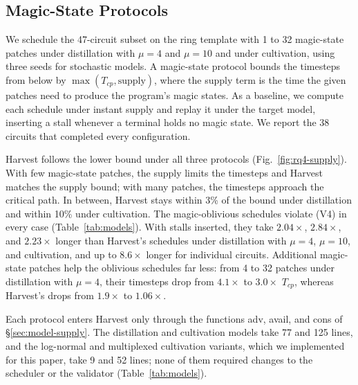 \subsection{Magic-State Protocols}
\label{sec:eval-supply}





We schedule the 47-circuit subset on the ring template with 1 to 32 magic-state patches under distillation with $\mu = 4$ and $\mu = 10$ and under cultivation, using three seeds for stochastic models.
A magic-state protocol bounds the timesteps from below by $\max(T_{cp}, \text{supply})$, where the supply term is the time the given patches need to produce the program's magic states.
As a baseline, we compute each schedule under instant supply and replay it under the target model, inserting a stall whenever a terminal holds no magic state.
We report the 38 circuits that completed every configuration.

Harvest follows the lower bound under all three protocols (Fig.~\ref{fig:rq4-supply}).
With few magic-state patches, the supply limits the timesteps and Harvest matches the supply bound; with many patches, the timesteps approach the critical path.
In between, Harvest stays within 3\% of the bound under distillation and within 10\% under cultivation.
The magic-oblivious schedules violate (V4) in every case (Table~\ref{tab:models}).
With stalls inserted, they take $2.04\times$, $2.84\times$, and $2.23\times$ longer than Harvest's schedules under distillation with $\mu = 4$, $\mu = 10$, and cultivation, and up to $8.6\times$ longer for individual circuits.
Additional magic-state patches help the oblivious schedules far less: from 4 to 32 patches under distillation with $\mu = 4$, their timesteps drop from $4.1\times$ to $3.0\times$ $T_{cp}$, whereas Harvest's drops from $1.9\times$ to $1.06\times$.

Each protocol enters Harvest only through the functions adv, avail, and cons of \S\ref{sec:model-supply}.
The distillation and cultivation models take 77 and 125 lines, and the log-normal and multiplexed cultivation variants, which we implemented for this paper, take 9 and 52 lines; none of them required changes to the scheduler or the validator (Table~\ref{tab:models}).

